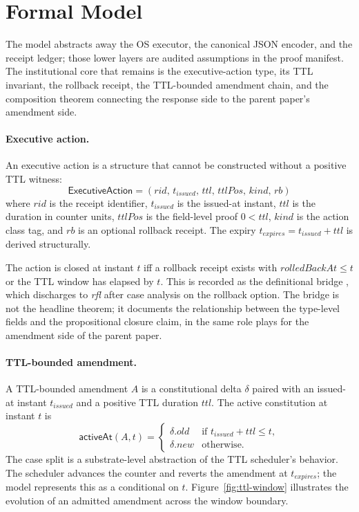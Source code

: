 \section{Formal Model}
\label{sec:model-ra}

The model abstracts away the OS executor, the canonical JSON encoder,
and the receipt ledger; those lower layers are audited assumptions in
the proof manifest. The institutional core that remains is the
executive-action type, its TTL invariant, the rollback receipt, the
TTL-bounded amendment chain, and the composition theorem connecting
the response side to the parent paper's amendment side.

\paragraph{Executive action.}
An executive action is a structure that cannot be constructed without
a positive TTL witness:
\[
  \mathsf{ExecutiveAction} =
  (\mathit{rid},\,\mathit{t_{\text{issued}}},\,\mathit{ttl},\,
   \mathit{ttlPos},\,\mathit{kind},\,\mathit{rb})
\]
where $\mathit{rid}$ is the receipt identifier, $\mathit{t_{\text{issued}}}$
is the issued-at instant, $\mathit{ttl}$ is the duration in counter
units, $\mathit{ttlPos}$ is the field-level proof $0 < \mathit{ttl}$,
$\mathit{kind}$ is the action class tag, and $\mathit{rb}$ is an
optional rollback receipt. The expiry $\mathit{t_{\text{expires}}} =
\mathit{t_{\text{issued}}} + \mathit{ttl}$ is derived structurally.

The action is closed at instant $t$ iff a rollback receipt exists with
$\mathit{rolledBackAt} \le t$ or the TTL window has elapsed by $t$.
This is recorded as the definitional bridge
, which discharges to
\emph{rfl} after case analysis on the rollback option. The bridge is
not the headline theorem; it documents the relationship between the
type-level fields and the propositional closure claim, in the same
role  plays for the
amendment side of the parent paper.

\paragraph{TTL-bounded amendment.}
A TTL-bounded amendment $A$ is a constitutional delta $\delta$ paired
with an issued-at instant $\mathit{t_{\text{issued}}}$ and a positive
TTL duration $\mathit{ttl}$. The active constitution at instant $t$ is
\[
  \mathsf{activeAt}(A, t) =
  \begin{cases}
    \delta.\mathit{old} & \text{if } \mathit{t_{\text{issued}}} + \mathit{ttl} \le t, \\
    \delta.\mathit{new} & \text{otherwise.}
  \end{cases}
\]
The case split is a substrate-level abstraction of the TTL scheduler's
behavior. The scheduler advances the counter and reverts the amendment
at $\mathit{t_{\text{expires}}}$; the model represents this as a
conditional on $t$. Figure~\ref{fig:ttl-window} illustrates the
evolution of an admitted amendment across the window boundary.

